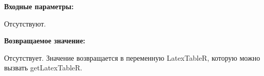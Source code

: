 \textbf{Входные параметры:}

Отсутствуют.

\textbf{Возвращаемое значение:}

Отсутствует. Значение возвращается в переменную LatexTableR, которую можно вызвать getLatexTableR.